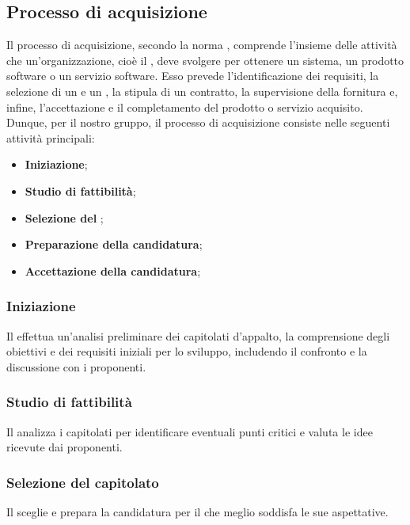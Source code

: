 \subsection{Processo di acquisizione}
\label{subsection:Processo_acquisizione}
Il processo di acquisizione, secondo la norma , comprende l'insieme delle attività che un'organizzazione, cioè il , deve svolgere per ottenere un sistema, un prodotto software o un servizio software. Esso prevede l'identificazione dei requisiti, la selezione di un  e un , la stipula di un contratto, la supervisione della fornitura e, infine, l'accettazione e il completamento del prodotto o servizio acquisito.
Dunque, per il nostro gruppo, il processo di acquisizione consiste nelle seguenti attività principali:

\begin{itemize}
    \item \textbf{Iniziazione}; 
    \item \textbf{Studio di fattibilità}; 
    \item \textbf{Selezione del }; 
    \item \textbf{Preparazione della candidatura}; 
    \item \textbf{Accettazione della candidatura}; 
\end{itemize}

\subsubsection{Iniziazione}
Il  effettua un'analisi preliminare dei capitolati d’appalto, la comprensione degli obiettivi e dei requisiti iniziali per lo sviluppo, includendo il confronto e la discussione con i proponenti.

\subsubsection{Studio di fattibilità}
Il  analizza i capitolati per identificare eventuali punti critici e valuta le idee ricevute dai proponenti.

\subsubsection{Selezione del capitolato}
Il  sceglie e prepara la candidatura per il  che meglio soddisfa le sue aspettative.

